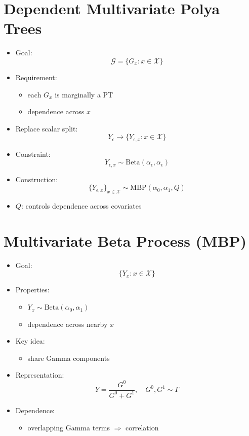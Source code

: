 \documentclass[12pt,oneside]{book}
\numberwithin{equation}{section}
\theoremstyle{definition}
\theoremstyle{plain}
\theoremstyle{remark}
\begin{document}
\section{Dependent Multivariate Polya Trees}

\begin{itemize}
\item Goal:
\[
\mathcal{G} = \{G_x : x \in \mathcal{X}\}
\]

\item Requirement:
\begin{itemize}
\item each $G_x$ is marginally a PT
\item dependence across $x$
\end{itemize}

\item Replace scalar split:
\[
Y_\epsilon \rightarrow \{Y_{\epsilon,x} : x \in \mathcal{X}\}
\]

\item Constraint:
\[
Y_{\epsilon,x} \sim \text{Beta}(\alpha_\epsilon,\alpha_\epsilon)
\]

\item Construction:
\[
\{Y_{\epsilon,x}\}_{x \in \mathcal{X}} \sim \text{MBP}(\alpha_0,\alpha_1,Q)
\]

\item $Q$: controls dependence across covariates
\end{itemize}

\section{Multivariate Beta Process (MBP)}

\begin{itemize}
\item Goal:
\[
\{Y_x : x \in \mathcal{X}\}
\]

\item Properties:
\begin{itemize}
\item $Y_x \sim \text{Beta}(\alpha_0,\alpha_1)$
\item dependence across nearby $x$
\end{itemize}

\item Key idea:
\begin{itemize}
\item share Gamma components
\end{itemize}

\item Representation:
\[
Y = \frac{G^0}{G^0 + G^1}, \quad G^0,G^1 \sim \Gamma
\]

\item Dependence:
\begin{itemize}
\item overlapping Gamma terms $\Rightarrow$ correlation
\end{itemize}
\end{itemize}
\end{document}
